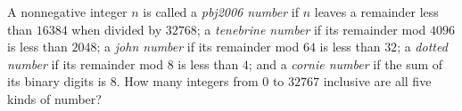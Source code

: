 A nonnegative integer $n$ is called a \emph{pbj2006 number} if $n$ leaves a remainder less than $16384$ when divided by $32768$; a \emph{tenebrine number} if its remainder mod $4096$ is less than $2048$; a \emph{john number} if its remainder mod $64$ is less than $32$; a \emph{dotted number} if its remainder mod $8$ is less than $4$; and a \emph{cornie number} if the sum of its binary digits is $8$. How many integers from $0$ to $32767$ inclusive are all five kinds of number?
